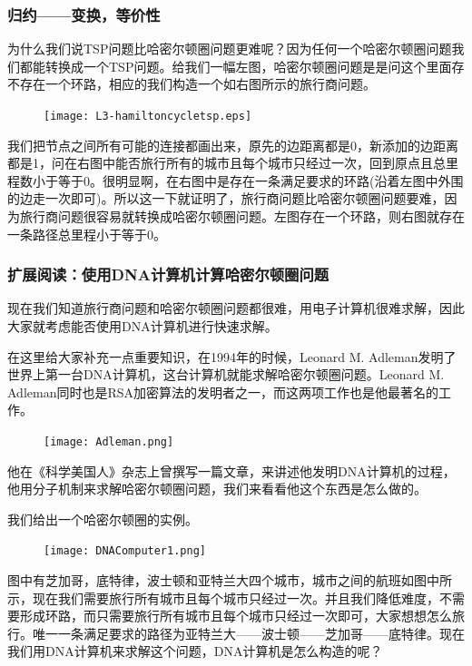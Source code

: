  \subsubsection{归约——变换，等价性}

 为什么我们说TSP问题比哈密尔顿圈问题更难呢？因为任何一个哈密尔顿圈问题我们都能转换成一个TSP问题。给我们一幅左图，哈密尔顿圈问题是是问这个里面存不存在一个环路，相应的我们构造一个如右图所示的旅行商问题。

 \begin{figure}[H]
 \centering
 \texttt{[image: L3-hamiltoncycletsp.eps]}
\end{figure}

我们把节点之间所有可能的连接都画出来，原先的边距离都是0，新添加的边距离都是1，问在右图中能否旅行所有的城市且每个城市只经过一次，回到原点且总里程数小于等于0。很明显啊，在右图中是存在一条满足要求的环路(沿着左图中外围的边走一次即可)。所以这一下就证明了，旅行商问题比哈密尔顿圈问题要难，因为旅行商问题很容易就转换成哈密尔顿圈问题。左图存在一个环路，则右图就存在一条路径总里程小于等于0。

\subsubsection{扩展阅读：使用DNA计算机计算哈密尔顿圈问题}

现在我们知道旅行商问题和哈密尔顿圈问题都很难，用电子计算机很难求解，因此大家就考虑能否使用DNA计算机进行快速求解。

在这里给大家补充一点重要知识，在1994年的时候，Leonard M. Adleman发明了世界上第一台DNA计算机，这台计算机就能求解哈密尔顿圈问题。Leonard M. Adleman同时也是RSA加密算法的发明者之一，而这两项工作也是他最著名的工作。

\begin{figure}[H]
\centering
 \texttt{[image: Adleman.png]}
\end{figure}

他在《科学美国人》杂志上曾撰写一篇文章，来讲述他发明DNA计算机的过程，他用分子机制来求解哈密尔顿圈问题，我们来看看他这个东西是怎么做的。

我们给出一个哈密尔顿圈的实例。

\begin{figure}[H]
\centering
 \texttt{[image: DNAComputer1.png]}
\end{figure}

图中有芝加哥，底特律，波士顿和亚特兰大四个城市，城市之间的航班如图中所示，现在我们需要旅行所有城市且每个城市只经过一次。并且我们降低难度，不需要形成环路，而只需要旅行所有城市且每个城市只经过一次即可，大家想想怎么旅行。唯一一条满足要求的路径为亚特兰大——波士顿——芝加哥——底特律。现在我们用DNA计算机来求解这个问题，DNA计算机是怎么构造的呢？

